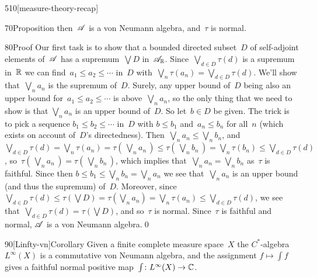 \begin{parsec}{510}[measure-theory-recap]
\begin{point}{70}{Proposition}
then~$\mathscr{A}$ is a von Neumann algebra,
and~$\tau$ is normal.
\begin{point}{80}{Proof}%
Our first task is to show that a bounded
directed subset~$D$ of self-adjoint elements of~$\mathscr{A}$
has a supremum~$\bigvee D$ in~$\mathscr{A}_{\mathbb{R}}$.
Since~$\bigvee_{d\in D} \tau(d)$
is a supremum in~$\mathbb{R}$
we can find~$a_1\leq a_2\leq \dotsb$ in~$D$
with~$\bigvee_n \tau(a_n) = \bigvee_{d\in D} \tau(d)$.
We'll show that~$\bigvee_n a_n$
is the supremum of~$D$.
Surely, any upper bound of~$D$ being also an upper bound 
for~$a_1\leq a_2\leq\dotsb$
is above~$\bigvee_n a_n$,
so the only thing that we need to show is that
$\bigvee_n a_n$ is an upper bound of~$D$.
So let~$b\in D$ be given.
The trick is to pick a sequence
$b_1\leq b_2\leq \dotsb$ in~$D$
with $b\leq b_1$ and~$a_n\leq b_n$ for all~$n$
(which exists on account of~$D$'s directedness).
Then~$\bigvee_n a_n \leq \bigvee_n b_n$,
and~$\bigvee_{d\in D} \tau(d) =\bigvee_n \tau(a_n)
=\tau(\,\bigvee_n a_n\,)
\leq \tau(\,\bigvee_n b_n\,)
= \bigvee_n \tau(b_n) \leq \bigvee_{d\in D} \tau(d)$,
so~$\tau(\,\bigvee_n a_n\,) = \tau(\,\bigvee_n b_n\,)$,
which implies that~$\bigvee_n a_n = \bigvee_n b_n$
as~$\tau$ is faithful.
Since then $b\leq b_1\leq \bigvee_n b_n = \bigvee_n a_n$
we see that~$\bigvee_n a_n$ is an upper bound
(and thus the supremum) of~$D$.
Moreover,
since
$\bigvee_{d\in D} \tau(d) \leq
\tau(\bigvee D)
=\tau(\bigvee_n a_n)
=\bigvee_n\tau(a_n)
\leq \bigvee_{d\in D} \tau(d)$,
we see that~$\bigvee_{d\in D} \tau(d)
= \tau(\bigvee D)$,
and so~$\tau$ is normal.
Since~$\tau$ is faithful
and normal, $\mathscr{A}$ is a von Neumann algebra.\qed
\end{point}
\end{point}
\begin{point}{90}[Linfty-vn]{Corollary}%
Given a finite complete measure space~$X$ 
the $C^*$-algebra $L^\infty(X)$
is a commutative von Neumann algebra,
and the assignment $f\mapsto \int f$
gives a faithful normal positive
map~$\int\colon L^\infty(X)\to\mathbb{C}$.
\end{point}
\end{parsec}
